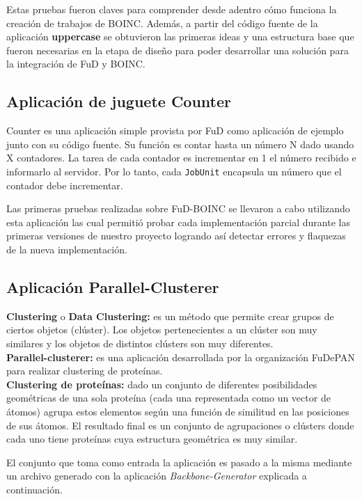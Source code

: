 Estas pruebas fueron claves para comprender desde adentro cómo funciona la creación de trabajos de BOINC. Además, a partir del código fuente de la aplicación \textbf{uppercase} se obtuvieron las primeras ideas y una estructura base que fueron necesarias en la etapa de diseño para poder desarrollar una solución para la integración de FuD y BOINC.


\subsection{Aplicación de juguete Counter}

Counter es una aplicación simple provista por FuD como aplicación de ejemplo junto con su código fuente. Su función es contar hasta un número N dado usando X contadores. La tarea de cada contador es incrementar en 1 el número recibido e informarlo al servidor. Por lo tanto, cada \texttt{JobUnit} encapsula un número que el contador debe incrementar.

Las primeras pruebas realizadas sobre FuD-BOINC se llevaron a cabo utilizando esta aplicación las cual permitió probar cada implementación parcial durante las primeras versiones de nuestro proyecto logrando así detectar errores y flaquezas de la nueva implementación.

\subsection{Aplicación Parallel-Clusterer}
\label{seccion:pruebas:clusterer}

\textbf{Clustering} o \textbf{Data Clustering:} es un método que permite crear grupos de ciertos objetos (clúster). Los objetos pertenecientes a un clúster son muy similares y los objetos de distintos clústers son muy diferentes.\\

\textbf{Parallel-clusterer:} es una aplicación desarrollada por la organización FuDePAN para realizar clustering de proteínas.\\ 

\textbf{Clustering de proteínas:} dado un conjunto de diferentes posibilidades geométricas de una sola proteína (cada una representada como un vector de átomos) agrupa estos elementos según una función de similitud en las posiciones de sus átomos. El resultado final es un conjunto de agrupaciones o clústers donde cada uno tiene proteínas cuya estructura geométrica es muy similar.

El conjunto que toma como entrada la aplicación es pasado a la misma mediante un archivo generado con la aplicación \textit{Backbone-Generator} explicada a continuación.\\

